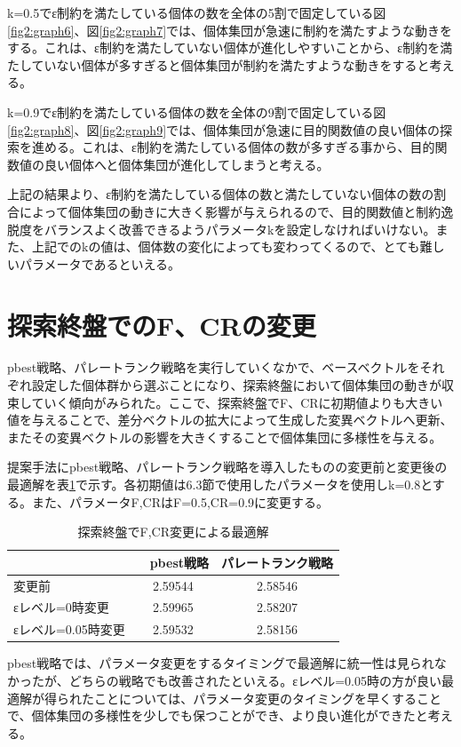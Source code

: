 \documentclass[twocolumn,10pt]{jarticle}
\begin{document}
k=0.5でε制約を満たしている個体の数を全体の5割で固定している図\ref{fig2:graph6}、図\ref{fig2:graph7}では、個体集団が急速に制約を満たすような動きをする。これは、ε制約を満たしていない個体が進化しやすいことから、ε制約を満たしていない個体が多すぎると個体集団が制約を満たすような動きをすると考える。

k=0.9でε制約を満たしている個体の数を全体の9割で固定している図\ref{fig2:graph8}、図\ref{fig2:graph9}では、個体集団が急速に目的関数値の良い個体の探索を進める。これは、ε制約を満たしている個体の数が多すぎる事から、目的関数値の良い個体へと個体集団が進化してしまうと考える。

上記の結果より、ε制約を満たしている個体の数と満たしていない個体の数の割合によって個体集団の動きに大きく影響が与えられるので、目的関数値と制約逸脱度をバランスよく改善できるようパラメータkを設定しなければいけない。また、上記でのkの値は、個体数の変化によっても変わってくるので、とても難しいパラメータであるといえる。

\section{探索終盤でのF、CRの変更}
pbest戦略、パレートランク戦略を実行していくなかで、ベースベクトルをそれぞれ設定した個体群から選ぶことになり、探索終盤において個体集団の動きが収束していく傾向がみられた。ここで、探索終盤でF、CRに初期値よりも大きい値を与えることで、差分ベクトルの拡大によって生成した変異ベクトルへ更新、またその変異ベクトルの影響を大きくすることで個体集団に多様性を与える。

提案手法にpbest戦略、パレートランク戦略を導入したものの変更前と変更後の最適解を表\ref{tbl:MLP5}で示す。各初期値は6.3節で使用したパラメータを使用しk=0.8とする。また、パラメータF,CRはF=0.5,CR=0.9に変更する。

\begin{table}[htbp]
\begin{center}
\caption{探索終盤でF,CR変更による最適解}
\label{tbl:MLP5}
\begin{tabular}{|l|c|c|}
\hline
　　&　pbest戦略 & パレートランク戦略 \\ \hline
変更前 & 2.59544&  2.58546       \\ \hline
εレベル=0時変更 & 2.59965 &  2.58207    \\ \hline 
εレベル=0.05時変更 & 2.59532 &  2.58156    \\ \hline
\end{tabular}
\end{center}
\end{table}
pbest戦略では、パラメータ変更をするタイミングで最適解に統一性は見られなかったが、どちらの戦略でも改善されたといえる。εレベル=0.05時の方が良い最適解が得られたことについては、パラメータ変更のタイミングを早くすることで、個体集団の多様性を少しでも保つことができ、より良い進化ができたと考える。
\end{document}
